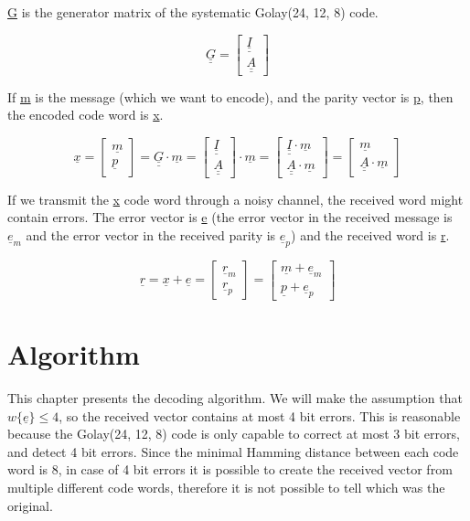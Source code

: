 \documentclass[11pt,a4paper,oneside]{report}             %
\def\doubleunderline#1{\underline{\underline{#1}}}
\def\ul#1{\underline{#1}}
\newcommand{\vect}[2]{\begin{bmatrix} #1 \\ #2 \end{bmatrix}}
\begin{document}
\doubleunderline{G} is the generator matrix of the systematic Golay(24, 12, 8) code.

\[
    \doubleunderline{G} =
    \begin{bmatrix}
        \doubleunderline{I} \\
        \doubleunderline{A}
    \end{bmatrix}
\]

If \underline{m} is the message (which we want to encode), and the parity vector is \underline{p},
then the encoded code word is \underline{x}.

\[
    \underline{x} = \begin{bmatrix}
        \underline{m} \\
        \underline{p}
    \end{bmatrix} = \doubleunderline{G} \cdot \underline{m} = \begin{bmatrix}
        \doubleunderline{I} \\
        \doubleunderline{A}
    \end{bmatrix} \cdot \underline{m} = \begin{bmatrix}
        \doubleunderline{I} \cdot \underline{m} \\
        \doubleunderline{A} \cdot \underline{m}
    \end{bmatrix} = \begin{bmatrix}
        \underline{m} \\
        \doubleunderline{A} \cdot \underline{m}
    \end{bmatrix}
\]

If we transmit the \underline{x} code word through a noisy channel, the received word might
contain errors. The error vector is \underline{e} (the error vector in the received message 
is $\underline{e}_m$ and the error vector in the received parity is $\underline{e}_p$)
and the received word is \underline{r}.

\[
    \ul{r} = \ul{x} + \ul{e} = \vect{\ul{r}_m}{\ul{r}_p} = \vect{\ul{m} + \ul{e}_m}{\ul{p} + \ul{e}_p}
\]

\chapter{Algorithm}

This chapter presents the decoding algorithm. We will make the assumption that $w\{\ul{e}\} \leq 4$,
so the received vector contains at most 4 bit errors. This is reasonable because the Golay(24, 12, 8)
code is only capable to correct at most 3 bit errors, and detect 4 bit errors. Since the minimal
Hamming distance between each code word is 8, in case of 4 bit errors it is possible to create the
received vector from multiple different code words, therefore it is not possible to tell which was
the original.
\end{document}
